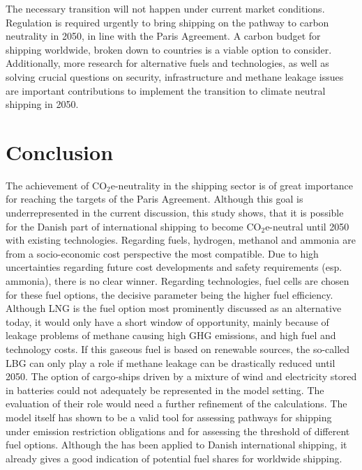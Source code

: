 \documentclass[article]{elsarticle}
\begin{document}
The necessary transition will not happen under current market conditions. Regulation is required urgently to bring shipping on the pathway to carbon neutrality in 2050, in line with the Paris Agreement. A carbon budget for shipping worldwide, broken down to countries is a viable option to consider. Additionally, more research for alternative fuels and technologies, as well as solving crucial questions on security, infrastructure and methane leakage issues are important contributions to implement the transition to climate neutral shipping in 2050. 


\section{Conclusion}
\label{sec:Conclusion}
The achievement of CO$_2$e-neutrality in the shipping sector is of great importance for reaching the targets of the Paris Agreement. Although this goal is underrepresented in the current discussion, this study shows, that it is possible for the Danish part of international shipping to become CO$_2$e-neutral until 2050 with existing technologies. Regarding fuels, hydrogen, methanol and ammonia are from a socio-economic cost perspective the most compatible. Due to high uncertainties regarding future cost developments and safety requirements (esp. ammonia), there is no clear winner. Regarding technologies, fuel cells are chosen for these fuel options, the decisive parameter being the higher fuel efficiency. Although LNG is the fuel option most prominently discussed as an alternative today, it would only have a short window of opportunity, mainly because of leakage problems of methane causing high GHG emissions, and high fuel and technology costs. If this gaseous fuel is based on renewable sources, the so-called LBG can only play a role if methane leakage can be drastically reduced until 2050. The option of cargo-ships driven by a mixture of wind and electricity stored in batteries could not adequately be represented in the model setting. The evaluation of their role would need a further refinement of the calculations. The model itself has shown to be a valid tool for assessing pathways for shipping under emission restriction obligations and for assessing the threshold of different fuel options. Although the has been applied to Danish international shipping, it already gives a good indication of potential fuel shares for worldwide shipping.
 
\end{document}
